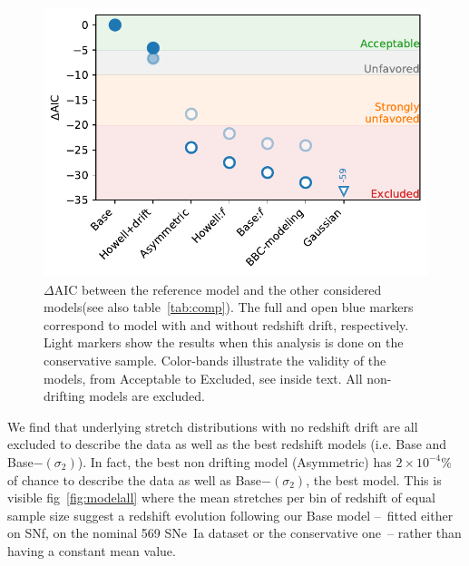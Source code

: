 \documentclass[]{aa} %
\newcommand{\mr}[1]{{\textcolor[rgb]{0.60,0.10,0.6}{#1}}}
\begin{document}
\begin{figure}
    \centering
    \includegraphics[width=\linewidth]{Article_figures/mod_comp.pdf}
    \caption{$\Delta$AIC between the reference model and the other considered
    models(see also table~\ref{tab:comp}). The full and open blue markers
correspond to model with and without redshift drift, respectively. Light markers
show the results when this analysis is done on the conservative sample.
Color-bands illustrate the validity of the models, from Acceptable to Excluded,
see inside text. All non-drifting models are excluded.}
    \label{fig:mod_comp}
\end{figure}

\mr{We find that underlying stretch distributions with no redshift drift are all
excluded to describe the data as well as the best redshift models (i.e. Base and
Base$-(\sigma_2)$). In fact, the best non drifting model (Asymmetric) has
$2\times10^{-4}\%$ of chance to describe the data as well as Base$-(\sigma_2)$,
the best model.  This is visible fig~\ref{fig:modelall} where the mean stretches
per bin of redshift of equal sample size suggest a redshift evolution following
our Base model --~fitted either on SNf, on the nominal 569 SNe~Ia dataset or the
conservative one~-- rather than having a constant mean value.}
\end{document}
